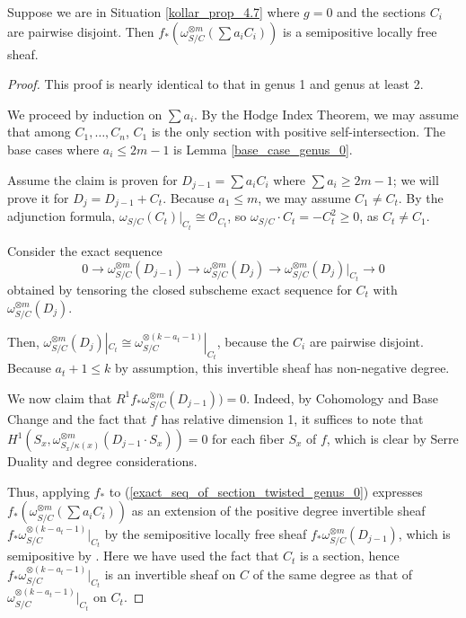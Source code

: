 \begin{lemma}\label{inductive_step_genus_0}
Suppose we are in Situation \ref{kollar_prop_4.7} where $g=0$ and the sections $C_i$ are pairwise disjoint.
Then $f_{*}(\omega_{S/C}^{\otimes m}(\sum a_iC_i))$ is a semipositive locally free sheaf.
\end{lemma}
\begin{proof}
This proof is nearly identical to that in genus 1 and genus at least 2.

We proceed by induction on $\sum a_i$.
By the Hodge Index Theorem, we may assume that among $C_1,\ldots,C_n$, $C_1$ is the only section with positive self-intersection.
The base cases where $a_i\le 2m-1$ is Lemma \ref{base_case_genus_0}.

Assume the claim is proven for $D_{j-1}=\sum a_iC_i$ where $\sum a_i\ge 2m-1$; we will prove it for $D_{j}=D_{j-1}+C_t$.
Because $a_{1}\le m$, we may assume $C_1\neq C_t$.
By the adjunction formula, $\omega_{S/C}(C_t)|_{C_t}\cong\mathcal{O}_{C_t}$, so $\omega_{S/C}\cdot C_t=-C_t^2\ge0$, as $C_t\neq C_1$.

Consider the exact sequence
\begin{equation*}\label{exact_seq_of_section_twisted_genus_0}
0\to\omega_{S/C}^{\otimes m}(D_{j-1})\to\omega_{S/C}^{\otimes m}(D_j)\to \omega_{S/C}^{\otimes m}(D_j)|_{C_t}\to0
\end{equation*}
obtained by tensoring the closed subscheme exact sequence for $C_t$ with $\omega_{S/C}^{\otimes m}(D_j)$.

Then, $\omega_{S/C}^{\otimes m}(D_j)|_{C_t}\cong \omega_{S/C}^{\otimes (k-a_{t}-1)}|_{C_t}$, because the $C_i$ are pairwise disjoint.
Because $a_{t}+1\le k$ by assumption, this invertible sheaf has non-negative degree.

We now claim that $R^{1}f_{*}\omega_{S/C}^{\otimes m}(D_{j-1}))=0$.
Indeed, by Cohomology and Base Change and the fact that $f$ has relative dimension 1, it suffices to note that $H^{1}(S_x,\omega_{S_x/\kappa(x)}^{\otimes m}(D_{j-1}\cdot S_x))=0$ for each fiber $S_x$ of $f$, which is clear by Serre Duality and degree considerations.

Thus, applying $f_{*}$ to (\ref{exact_seq_of_section_twisted_genus_0}) expresses $f_{*}(\omega_{S/C}^{\otimes m}(\sum a_iC_i))$ as an extension of the positive degree invertible sheaf $f_{*}\omega_{S/C}^{\otimes (k-a_{t}-1)}|_{C_t}$ by the semipositive locally free sheaf $f_{*}\omega_{S/C}^{\otimes m}(D_{j-1})$, which is semipositive by .
Here we have used the fact that $C_t$ is a section, hence $f_{*}\omega_{S/C}^{\otimes (k-a_{t}-1)}|_{C_t}$ is an invertible sheaf on $C$ of the same degree as that of $\omega_{S/C}^{\otimes (k-a_{t}-1)}|_{C_t}$ on $C_t$.
\end{proof}


